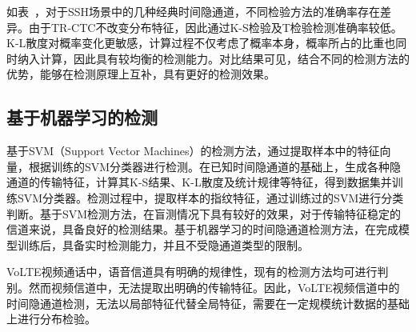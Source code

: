 
如表\ ，对于SSH场景中的几种经典时间隐通道，不同检验方法的准确率存在差异。由于TR-CTC不改变分布特征，因此通过K-S检验及T检验检测准确率较低。K-L散度对概率变化更敏感，计算过程不仅考虑了概率本身，概率所占的比重也同时纳入计算，因此具有较均衡的检测能力。对比结果可见，结合不同的检测方法的优势，能够在检测原理上互补，具有更好的检测效果。

\subsection{基于机器学习的检测}
\label{chap:backinfo:detect:machine}
基于SVM（Support Vector Machines）的检测方法，通过提取样本中的特征向量，根据训练的SVM分类器进行检测。在已知时间隐通道的基础上，生成各种隐通道的传输特征，计算其K-S结果、K-L散度及统计规律等特征，得到数据集并训练SVM分类器。检测过程中，提取样本的指纹特征，通过训练过的SVM进行分类判断。基于SVM检测方法，在盲测情况下具有较好的效果，对于传输特征稳定的信道来说，具备良好的检测结果。基于机器学习的时间隐通道检测方法，在完成模型训练后，具备实时检测能力，并且不受隐通道类型的限制。

VoLTE视频通话中，语音信道具有明确的规律性，现有的检测方法均可进行判别。然而视频信道中，无法提取出明确的传输特征。因此，VoLTE视频信道中的时间隐通道检测，无法以局部特征代替全局特征，需要在一定规模统计数据的基础上进行分布检验。